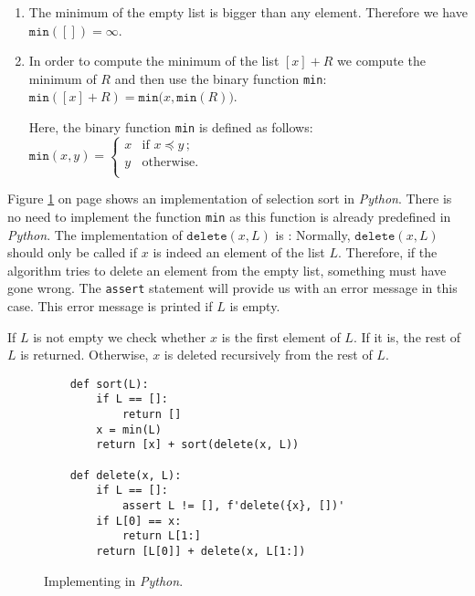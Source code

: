 \begin{enumerate}
\item The minimum of the empty list is bigger than any element.  Therefore we have 
      \\[0.2cm]
      \hspace*{1.3cm} $\mathtt{min}([]) = \infty$.
\item In order to compute the minimum of the list $[x] + R$ we compute the minimum of $R$ and
      then use the binary function \texttt{min}: \\[0.2cm]
      \hspace*{1.3cm} 
      $\mathtt{min}([x] + R) = \mathtt{min}\bigl(x, \mathtt{min}(R) \bigr)$. 

      Here, the binary function \texttt{min} is defined as follows: \\[0.2cm]
      \hspace*{1.3cm} 
      $\mathtt{min}(x,y) = \left\{
      \begin{array}{ll}
        x  & \mbox{if $x \preceq y\,$;} \\
        y  & \mbox{otherwise.} \\
      \end{array}\right.
      $
\end{enumerate}
Figure \ref{fig:selection-sort.setlx} on page \pageref{fig:selection-sort.setlx} shows an
implementation of selection sort in \textsl{Python}.  There is no need to implement the function
\texttt{min} as this function is already predefined in \textsl{Python}. 
The implementation of $\mathtt{delete}(x,L)$ is :  Normally, $\mathtt{delete}(x, L)$
should only be called if $x$ is indeed an element of the list $L$.   Therefore, if the algorithm tries 
to delete an element from the empty list, something must have gone wrong.  The \texttt{assert}
statement will provide us with an error message in this case.  This error message is printed if $L$ is empty.

If $L$ is not empty we check whether $x$ is the first element of $L$.  If it is, the rest of $L$ is
returned.  Otherwise, $x$ is deleted recursively from the rest of $L$.



\begin{figure}[!ht]
  \centering
\begin{verbatim}
    def sort(L):
        if L == []:
            return []
        x = min(L)
        return [x] + sort(delete(x, L))
    
    def delete(x, L):
        if L == []:
            assert L != [], f'delete({x}, [])'
        if L[0] == x:
            return L[1:]
        return [L[0]] + delete(x, L[1:])
\end{verbatim}
\vspace*{-0.3cm}
  \caption{Implementing  in \textsl{Python}.}
  \label{fig:selection-sort.setlx}
\end{figure}

